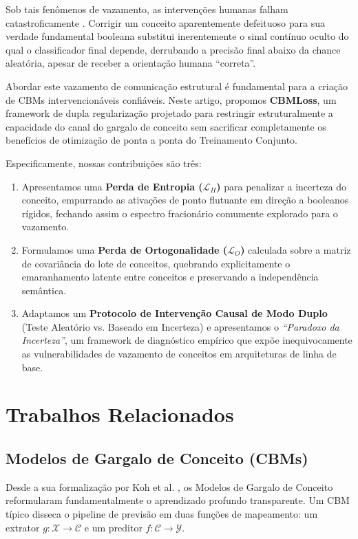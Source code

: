 \documentclass[times,twocolumn,final]{elsarticle}
\begin{document}
Sob tais fenômenos de vazamento, as intervenções humanas falham catastroficamente \citep{oikarinen2023label}. Corrigir um conceito aparentemente defeituoso para sua verdade fundamental booleana substitui inerentemente o sinal contínuo oculto do qual o classificador final depende, derrubando a precisão final abaixo da chance aleatória, apesar de receber a orientação humana ``correta''.

Abordar este vazamento de comunicação estrutural é fundamental para a criação de CBMs intervencionáveis confiáveis. Neste artigo, propomos \textbf{CBMLoss}, um framework de dupla regularização projetado para restringir estruturalmente a capacidade do canal do gargalo de conceito sem sacrificar completamente os benefícios de otimização de ponta a ponta do Treinamento Conjunto.

Especificamente, nossas contribuições são três:
\begin{enumerate}
    \item Apresentamos uma \textbf{Perda de Entropia ($\mathcal{L}_H$)} para penalizar a incerteza do conceito, empurrando as ativações de ponto flutuante em direção a booleanos rígidos, fechando assim o espectro fracionário comumente explorado para o vazamento.
    \item Formulamos uma \textbf{Perda de Ortogonalidade ($\mathcal{L}_O$)} calculada sobre a matriz de covariância do lote de conceitos, quebrando explicitamente o emaranhamento latente entre conceitos e preservando a independência semântica.
    \item Adaptamos um \textbf{Protocolo de Intervenção Causal de Modo Duplo} (Teste Aleatório vs. Baseado em Incerteza) e apresentamos o \textit{``Paradoxo da Incerteza''}, um framework de diagnóstico empírico que expõe inequivocamente as vulnerabilidades de vazamento de conceitos em arquiteturas de linha de base.
\end{enumerate}

\section{Trabalhos Relacionados}
\label{sec:related}

\subsection{Modelos de Gargalo de Conceito (CBMs)}
Desde a sua formalização por Koh et al. \citep{koh2020concept}, os Modelos de Gargalo de Conceito reformularam fundamentalmente o aprendizado profundo transparente. Um CBM típico disseca o pipeline de previsão em duas funções de mapeamento: um extrator $g: \mathcal{X} \rightarrow \mathcal{C}$ e um preditor $f: \mathcal{C} \rightarrow \mathcal{Y}$.
\end{document}
